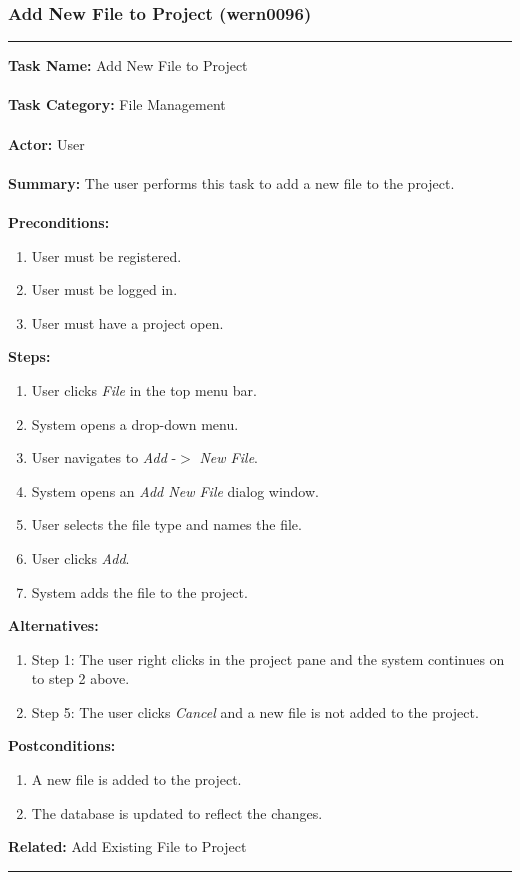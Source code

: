 \documentclass[11pt]{report}
\begin{document}
\subsubsection{Add New File to Project (wern0096)}
\vspace{2pt}
\hrule
\vspace{8pt}
	\noindent\textbf{Task Name:} Add New File to Project \\ \\
	\textbf{Task Category:} File Management \\ \\
	\textbf{Actor:} User \\ \\
	\textbf{Summary:} The user performs this task to add a new file to the project. \\ \\
	\textbf{Preconditions:} 
	\begin{enumerate}
		\item User must be registered.
		\item User must be logged in.
		\item User must have a project open.
	\end{enumerate}
	\textbf{Steps:}
	\begin{enumerate}
		\item User clicks \textit{File} in the top menu bar.
		\item System opens a drop-down menu.
		\item User navigates to \textit{Add} -$>$ \textit{New File}.
		\item System opens an \textit{Add New File} dialog window.
		\item User selects the file type and names the file.
		\item User clicks \textit{Add}.
		\item System adds the file to the project.
	\end{enumerate}
	\textbf{Alternatives:} 
	\begin{enumerate}
		\item Step 1: The user right clicks in the project pane and the system continues on to step 2 above.
		\item Step 5: The user clicks \textit{Cancel} and a new file is not added to the project.
	\end{enumerate}
	\textbf{Postconditions:}
	\begin{enumerate}
		\item A new file is added to the project.
		\item The database is updated to reflect the changes.
	\end{enumerate}
	\textbf{Related:} Add Existing File to Project
\hrule
\vspace{8pt} 
\end{document}
